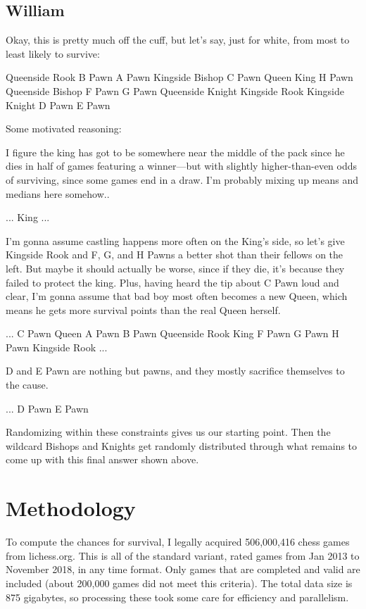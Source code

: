 \documentclass[twocolumn]{article}
\begin{document}
\subsection{William}

Okay, this is pretty much off the cuff, but let's say, just for white,
from most to least likely to survive:

Queenside Rook
B Pawn
A Pawn
Kingside Bishop
C Pawn
Queen
King
H Pawn
Queenside Bishop
F Pawn
G Pawn
Queenside Knight
Kingside Rook
Kingside Knight
D Pawn
E Pawn

Some motivated reasoning:

I figure the king has got to be somewhere near the middle of the pack
since he dies in half of games featuring a winner---but with slightly
higher-than-even odds of surviving, since some games end in a draw.
I’m probably mixing up means and medians here somehow..

...
King
...

I’m gonna assume castling happens more often on the King’s side, so
let’s give Kingside Rook and F, G, and H Pawns a better shot than
their fellows on the left. But maybe it should actually be worse,
since if they die, it's because they failed to protect the king. Plus,
having heard the tip about C Pawn loud and clear, I’m gonna assume
that bad boy most often becomes a new Queen, which means he gets more
survival points than the real Queen herself.

...
C Pawn
Queen
A Pawn
B Pawn
Queenside Rook
King
F Pawn
G Pawn
H Pawn
Kingside Rook
...

D and E Pawn are nothing but pawns, and they mostly sacrifice
themselves to the cause.

...
D Pawn
E Pawn

Randomizing within these constraints gives us our starting point. Then
the wildcard Bishops and Knights get randomly distributed through what
remains to come up with this final answer shown above.

\section{Methodology}

To compute the chances for survival, I legally acquired 506,000,416
chess games from lichess.org. This is all of the standard variant,
rated games from Jan 2013 to November 2018, in any time format. Only
games that are completed and valid are included (about 200,000 games
did not meet this criteria). The total data size is 875 gigabytes, so
processing these took some care for efficiency and parallelism.
\end{document}
